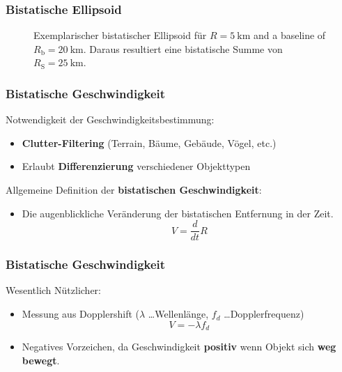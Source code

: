 \begin{frame}
    \frametitle{Bistatische Ellipsoid}

    \begin{figure}
        \centering
        \begin{adjustbox}{max width=\textwidth,totalheight=\baselineskip}
            \begin{tikzpicture}
                
            \end{tikzpicture}
        \end{adjustbox}
        \caption{Exemplarischer bistatischer Ellipsoid für \(R = \SI{5}{\kilo\metre}\) and a baseline of \(R_{\text{b}} = \SI{20}{\kilo\metre}\). Daraus resultiert eine bistatische Summe von \(R_{\text{S}} = \SI{25}{\kilo\metre}\).}
    \end{figure}
\end{frame}

\begin{frame}
    \frametitle{Bistatische Geschwindigkeit}

    Notwendigkeit der Geschwindigkeitsbestimmung:
    \begin{itemize}
        \item \textbf{Clutter-Filtering} (Terrain, Bäume, Gebäude, Vögel, etc.)
        \item Erlaubt \textbf{Differenzierung} verschiedener Objekttypen
    \end{itemize}

    Allgemeine Definition der \textbf{bistatischen Geschwindigkeit}:
    \begin{itemize}
        \item Die augenblickliche Veränderung der bistatischen Entfernung in der Zeit.
              \begin{equation}
                  V = \frac{d}{d t} R
              \end{equation}
    \end{itemize}

\end{frame}


\begin{frame}
    \frametitle{Bistatische Geschwindigkeit}

    Wesentlich Nützlicher:
    \begin{itemize}
        \item Messung aus Dopplershift (\(\lambda\) \dots Wellenlänge, \(f_{d}\) \dots Dopplerfrequenz)
              \begin{equation}
                  V = - \lambda f_{d}
              \end{equation}
        \item Negatives Vorzeichen, da Geschwindigkeit \textbf{positiv} wenn Objekt sich \textbf{weg bewegt}.
    \end{itemize}

\end{frame}

